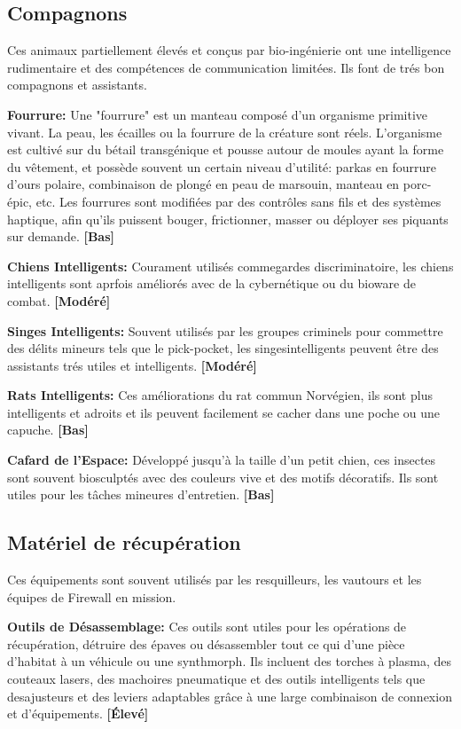 \subsection{Compagnons} \label{sec:pets} 

Ces animaux partiellement élevés et conçus par bio-ingénierie ont une intelligence rudimentaire et des compétences de communication limitées. Ils font de trés bon compagnons et assistants. 

\textbf{Fourrure:} Une "fourrure" est un manteau composé d'un organisme primitive vivant. La peau, les écailles ou la fourrure de la créature sont réels. L'organisme est cultivé sur du bétail transgénique et pousse autour de moules ayant la forme du vêtement, et possède souvent un certain niveau d'utilité: parkas en fourrure d'ours polaire, combinaison de plongé en peau de marsouin, manteau en porc-épic, etc. Les fourrures sont modifiées par des contrôles sans fils et des systèmes haptique, afin qu'ils puissent bouger, frictionner, masser ou déployer ses piquants sur demande. \textbf{[Bas]} 

\textbf{Chiens Intelligents:} Courament utilisés commegardes discriminatoire, les chiens intelligents sont aprfois améliorés avec de la cybernétique ou du bioware de combat. \textbf{[Modéré]} 

\textbf{Singes Intelligents:} Souvent utilisés par les groupes criminels pour commettre des délits mineurs tels que le pick-pocket, les singesintelligents peuvent être des assistants trés utiles et intelligents. \textbf{[Modéré]} 

\textbf{Rats Intelligents:} Ces améliorations du rat commun Norvégien, ils sont plus intelligents et adroits et ils peuvent facilement se cacher dans une poche ou une capuche. \textbf{[Bas]} 

\textbf{Cafard de l'Espace:} Développé jusqu'à la taille d'un petit chien, ces insectes sont souvent biosculptés avec des couleurs vive et des motifs décoratifs. Ils sont utiles pour les tâches mineures d'entretien. \textbf{[Bas]} 

\subsection{Matériel de récupération} \label{sec:scavenger-tech} 

Ces équipements sont souvent utilisés par les resquilleurs, les vautours et les équipes de Firewall en mission. 

\textbf{Outils de Désassemblage:} Ces outils sont utiles pour les opérations de récupération, détruire des épaves ou désassembler tout ce qui d'une pièce d'habitat à un véhicule ou une synthmorph. Ils incluent des torches à plasma, des couteaux lasers, des machoires pneumatique et des outils intelligents tels que desajusteurs et des leviers adaptables grâce à une large combinaison de connexion et d'équipements. \textbf{[Élevé]} 

